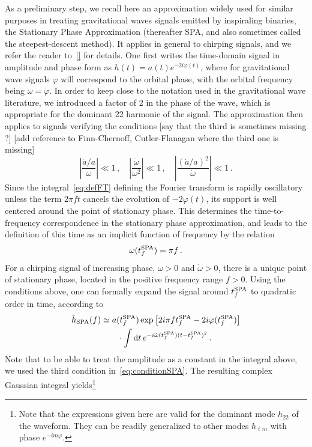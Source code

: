 \documentclass[aps,showpacs,twocolumn,
prd,superscriptaddress,nofootinbib]{revtex4-1}
\newcommand{\be}{\begin{equation}}
\newcommand{\ee}{\end{equation}}
\newcommand\ud{{\mathrm{d}}}
\newcommand{\nn}{\nonumber}
\newcommand{\tfSPA}{t_{f}^{\rm SPA}}
\newcommand{\SM}[1]{{\color{Red} #1}}
\begin{document}
As a preliminary step, we recall here an approximation widely used for similar purposes in treating gravitational waves signals emitted by inspiraling binaries, the Stationary Phase Approximation (thereafter SPA, and also sometimes called the steepest-descent method). It applies in general to chirping signals, and we refer the reader to~\ref{} for details. One first writes the time-domain signal in amplitude and phase form as $h(t) = a(t) e^{-2i\varphi(t)}$, where for gravitational wave signals $\varphi$ will correspond to the orbital phase, with the orbital frequency being $\omega = \dot{\varphi}$. In order to keep close to the notation used in the gravitational wave literature, we introduced a factor of 2 in the phase of the wave, which is appropriate for the dominant 22 harmonic of the signal. The approximation then applies to signals verifying the conditions \SM{[say that the third is sometimes missing ?]} \SM{[add reference to Finn-Chernoff, Cutler-Flanagan where the third one is missing]}
\be\label{eq:conditionsSPA}
	\left| \frac{\dot{a}/a}{\omega} \right| \ll 1\,, \quad \left|\frac{\dot{\omega}}{\omega^{2}} \right| \ll 1\,, \quad \left| \frac{(\dot{a}/a)^{2}}{\dot{\omega}} \right| \ll 1 \,.
\ee
Since the integral~\eqref{eq:defFT} defining the Fourier transform is rapidly oscillatory unless the term $2\pi f t$ cancels the evolution of $-2\varphi(t)$, its support is well centered around the point of stationary phase. This determines the time-to-frequency correspondence in the stationary phase approximation, and leads to the definition of this time as an implicit function of frequency by the relation
\be\label{eq:deftfSPA}
	\omega(\tfSPA) = \pi  f \,.
\ee
For a chirping signal of increasing phase, $\omega>0$ and $\dot{\omega}>0$, there is a unique point of stationary phase, located in the positive frequency range $f>0$. Using the conditions above, one can formally expand the signal around $\tfSPA$ to quadratic order in time, according to
\begin{align}
	\tilde{h}_{\rm SPA} (f) &\simeq a(\tfSPA) \exp\left[2i\pi f \tfSPA-2i\varphi(\tfSPA) \right] \nn\\
	& \qquad \cdot \int \ud t \, e^{-i \dot{\omega} (\tfSPA) (t-\tfSPA)^{2}} \,.
\end{align}
Note that to be able to treat the amplitude as a constant in the integral above, we used the third condition in~\eqref{eq:conditionSPA}. The resulting complex Gaussian integral yields\footnote{Note that the expressions given here are valid for the dominant mode $h_{22}$ of the waveform. They can be readily generalized to other modes $h_{\ell m}$ with phase $e^{-im\varphi}$.}
\end{document}
